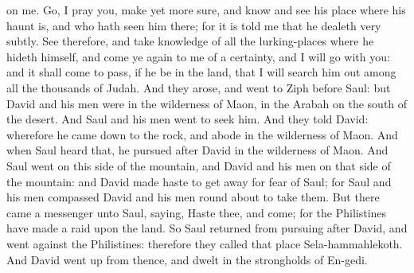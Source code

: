 on me. Go, I pray you, make yet more sure, and know and see his place where his haunt is, and who hath seen him there; for it is told me that he dealeth very subtly. See therefore, and take knowledge of all the lurking-places where he hideth himself, and come ye again to me of a certainty, and I will go with you: and it shall come to pass, if he be in the land, that I will search him out among all the thousands of Judah.  And they arose, and went to Ziph before Saul: but David and his men were in the wilderness of Maon, in the Arabah on the south of the desert. And Saul and his men went to seek him. And they told David: wherefore he came down to the rock, and abode in the wilderness of Maon. And when Saul heard that, he pursued after David in the wilderness of Maon. And Saul went on this side of the mountain, and David and his men on that side of the mountain: and David made haste to get away for fear of Saul; for Saul and his men compassed David and his men round about to take them. But there came a messenger unto Saul, saying, Haste thee, and come; for the Philistines have made a raid upon the land. So Saul returned from pursuing after David, and went against the Philistines: therefore they called that place Sela-hammahlekoth. And David went up from thence, and dwelt in the strongholds of En-gedi. 

